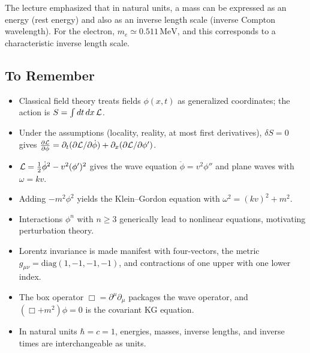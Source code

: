 
\begin{remark}
The lecture emphasized that in natural units, a mass can be expressed as
an energy (rest energy) and also as an inverse length scale (inverse
Compton wavelength). For the electron, \(m_e\simeq 0.511\,\mathrm{MeV}\),
and this corresponds to a characteristic inverse length scale.
\end{remark}

\subsection*{To Remember}

\begin{itemize}
  \item Classical field theory treats fields \(\phi(x,t)\) as generalized
    coordinates; the action is \(S=\int dt\,dx\,\mathcal{L}\).
  \item Under the assumptions (locality, reality, at most first
    derivatives), \(\delta S=0\) gives
    \(\frac{\partial \mathcal{L}}{\partial \phi}
    = \partial_t(\partial \mathcal{L}/\partial \dot\phi)
    + \partial_x(\partial \mathcal{L}/\partial \phi')\).
  \item \(\mathcal{L}=\frac12\dot\phi^2 - v^2(\phi')^2\) gives the wave equation
    \(\ddot\phi=v^2\phi''\) and plane waves with \(\omega=kv\).
  \item Adding \(-m^2\phi^2\) yields the Klein--Gordon equation with
    \(\omega^2=(kv)^2+m^2\).
  \item Interactions \(\phi^n\) with \(n\ge 3\) generically lead to
    nonlinear equations, motivating perturbation theory.
  \item Lorentz invariance is made manifest with four-vectors, the metric
    \(g_{\mu\nu}=\mathrm{diag}(1,-1,-1,-1)\), and contractions of one
    upper with one lower index.
  \item The box operator \(\Box=\partial^\mu\partial_\mu\) packages the
    wave operator, and \((\Box+m^2)\phi=0\) is the covariant KG equation.
  \item In natural units \(\hbar=c=1\), energies, masses, inverse
    lengths, and inverse times are interchangeable as units.
\end{itemize}

